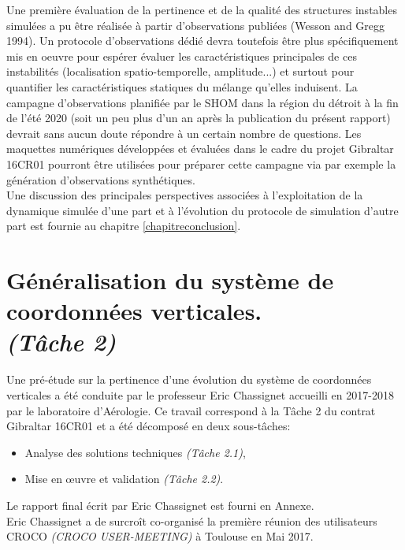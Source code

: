 \documentclass[a4paper,11pt]{report}
\begin{document}
Une première évaluation de la pertinence et de la qualité des structures instables simulées a pu être réalisée à partir d'observations publiées (Wesson and Gregg 1994). Un protocole d'observations dédié devra toutefois être plus spécifiquement mis en oeuvre pour espérer évaluer les caractéristiques principales de ces instabilités (localisation spatio-temporelle, amplitude...) et surtout pour quantifier les caractéristiques statiques du mélange qu'elles induisent. La campagne d'observations planifiée par le SHOM dans la région du détroit à la fin de l'été 2020 (soit un peu plus d'un an après la publication du présent rapport) devrait sans aucun doute répondre à un certain nombre de questions. Les maquettes numériques développées et évaluées dans le cadre du projet Gibraltar 16CR01 pourront être utilisées pour préparer cette campagne via par exemple la génération d'observations synthétiques.\\
Une discussion des principales perspectives associées à l'exploitation de la dynamique simulée d'une part et à l'évolution du protocole de simulation d'autre part est fournie au chapitre \ref{chapitreconclusion}.

\newpage
\section{Généralisation du système de coordonnées verticales.\\ \textit{(Tâche 2)}}

Une pré-étude sur la pertinence d'une évolution du système de coordonnées verticales a été conduite par le professeur Eric Chassignet accueilli en 2017-2018 par le laboratoire d'Aérologie. Ce travail correspond à la Tâche 2 du contrat Gibraltar 16CR01 et a été décomposé en deux sous-tâches:
\begin{itemize}
\item{Analyse des solutions techniques \textit{(Tâche 2.1)}},
\item{Mise en œuvre et validation \textit{(Tâche 2.2)}}.
\end{itemize}
Le rapport final écrit par Eric Chassignet est fourni en Annexe.\\
Eric Chassignet a de surcroît co-organisé la première réunion des utilisateurs CROCO \textit{(CROCO USER-MEETING)} à Toulouse en Mai 2017.\\
 
\end{document}
